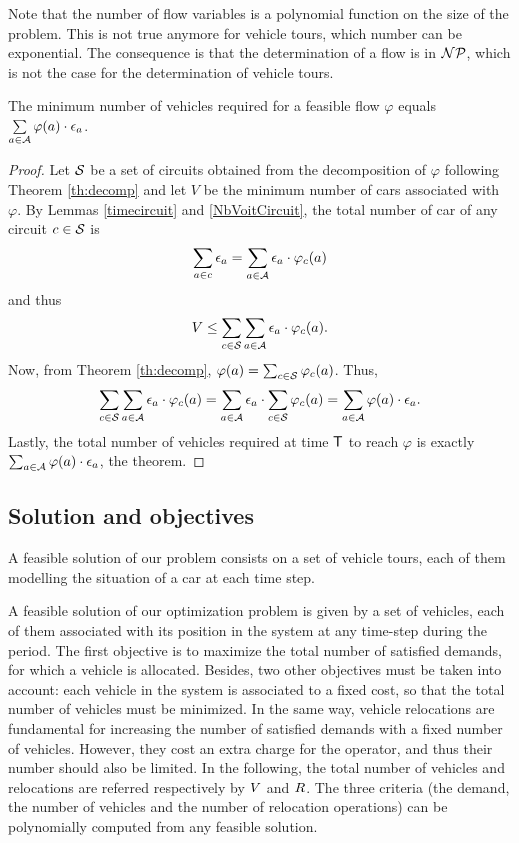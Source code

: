\begin{bibunit}[ieeetr]
Note that the  number of flow variables is a polynomial function on the size of the problem.
This is not true anymore for vehicle tours, which number can be exponential.
The consequence is that the determination of a flow is in ${\cal NP}$, which is not the case for the determination of vehicle tours.

\begin{theorem} \label{NbVoiture}
The minimum number of vehicles required for a feasible flow $\varphi$ equals $\sum\limits_{a\in \mathcal{A}} \varphi(a) \cdot \epsilon_a$.
\end{theorem}
\begin{proof}
Let ${\cal S}$ be a set of circuits obtained from the decomposition of $\varphi$ following Theorem \ref{th:decomp} and let $V$ be the minimum number of cars associated with $\varphi$.
By Lemmas \ref{timecircuit} and \ref{NbVoitCircuit}, the total number of car of any circuit $c \in {\cal S}$ is
\[\sum_{a\in c} \epsilon_a = \sum_{a\in \mathcal{A}} \epsilon_a \cdot \varphi_c(a)\]
and thus
\[V \leq \sum_{c\in {\cal S}} \sum_{a\in \mathcal{A}} \epsilon_a \cdot \varphi_c(a).\]
Now, from  Theorem \ref{th:decomp}, $\varphi (a)= \sum_{c\in {\cal S}}\varphi_c(a)$.
Thus, 
\[\sum_{c\in {\cal S}} \sum_{a\in \mathcal{A}} \epsilon_a \cdot \varphi_c(a)=\sum_{a\in \mathcal{A}} \epsilon_a \cdot \sum_{c\in {\cal S}}  \varphi_c(a)=\sum_{a\in \mathcal{A}} \varphi(a) \cdot \epsilon_a.\]
Lastly, the total number of vehicles required at time $\mathsf{T}$ to reach $\varphi$ is exactly $\sum_{a\in \mathcal{A}} \varphi(a) \cdot \epsilon_a$, the theorem.
\end{proof}

\subsection{Solution and objectives}
A feasible solution of our problem consists on a set of vehicle tours, each of them modelling the situation of a car at each time step.

\medskip
A feasible solution of our optimization problem is given by a set of vehicles, each of them associated with its position in the system at any time-step during the period.
The first objective is to maximize the total number of satisfied demands, \ie for which a vehicle is allocated.
Besides, two other objectives must be taken into account: each vehicle in the system is associated to a fixed cost, so that the total number of vehicles must be minimized. 
In the same way, vehicle relocations are fundamental for increasing the number of satisfied demands with a fixed  number of vehicles.
However, they cost an extra charge for the operator, and thus their number should also be limited.
In the following, the total number of vehicles and relocations are referred respectively by $V$ and $R$.
The three criteria (the demand, the number of vehicles and the number of relocation operations) can be polynomially computed from any feasible solution.


\end{bibunit}
